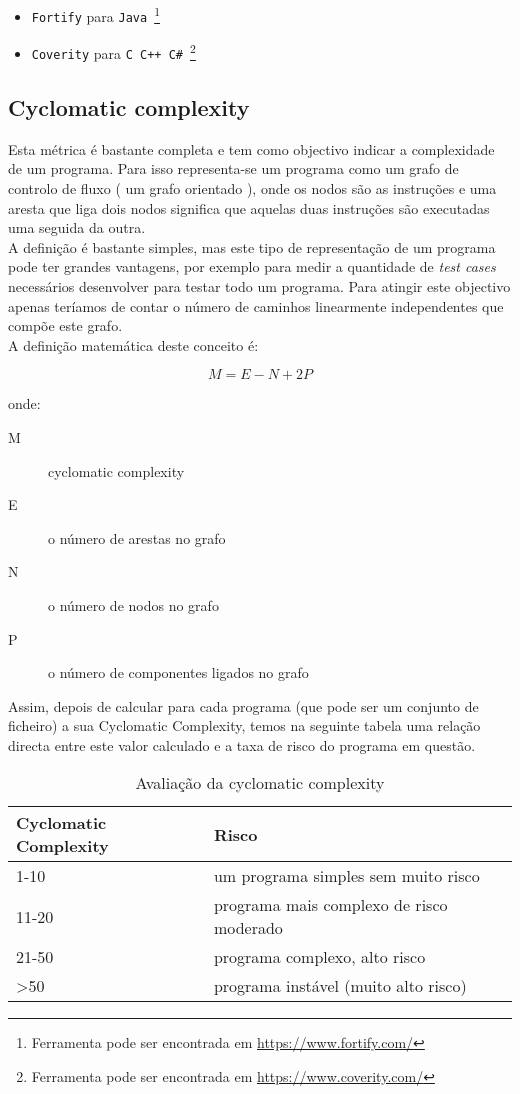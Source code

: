 \begin{itemize}
\item \texttt{Fortify} para \texttt{Java}~\footnote{Ferramenta pode ser encontrada em \url{https://www.fortify.com/}}
\item \texttt{Coverity} para \texttt{C C++ C\#}~\footnote{Ferramenta pode ser encontrada em \url{https://www.coverity.com/}} 
\end{itemize}

\subsection{Cyclomatic complexity}
Esta métrica é bastante completa e tem como objectivo indicar a complexidade de um programa. Para isso representa-se um programa como um grafo de controlo de fluxo ( um grafo orientado ), onde os nodos são as instruções e uma aresta que liga dois nodos significa que aquelas duas instruções são executadas uma seguida da outra.\\
A definição é bastante simples, mas este tipo de representação de um programa pode ter grandes vantagens, por exemplo para medir a quantidade de \emph{test cases} necessários desenvolver para testar todo um programa. Para atingir este objectivo apenas teríamos de contar o número de caminhos linearmente independentes que compõe este grafo.\\

A definição matemática deste conceito é:

$$M = E - N + 2P$$

onde:

\begin{description}
\item[M] cyclomatic complexity
\item[E] o número de arestas no grafo
\item[N] o número de nodos no grafo
\item[P] o número de componentes ligados no grafo
\end{description}

Assim, depois de calcular para cada programa (que pode ser um conjunto de ficheiro) a sua Cyclomatic Complexity, temos na seguinte tabela uma relação directa
entre este valor calculado e a taxa de risco do programa em questão.

\begin{table}[htbp]
\begin{center}
\begin{tabular}{|l|l|}\hline
Cyclomatic Complexity & Risco \\\hline
1-10  & um programa simples sem muito risco\\\hline
11-20 & programa mais complexo de risco moderado\\\hline
21-50  & programa complexo, alto risco\\\hline
>50  & programa instável (muito alto risco)\\\hline
\end{tabular}
\caption{Avaliação da cyclomatic complexity}
\end{center}
\end{table}

